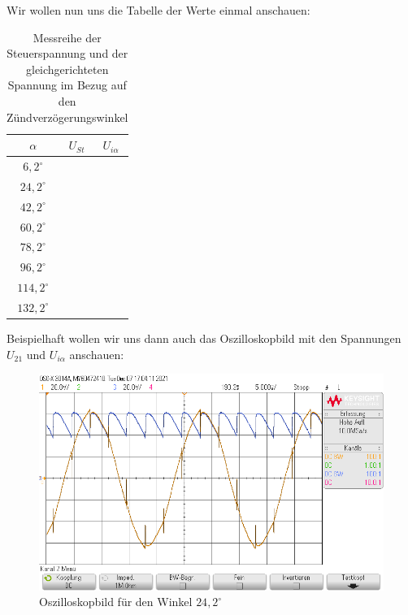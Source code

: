 \documentclass{article}
\begin{document}
\newpage

Wir wollen nun uns die Tabelle der Werte einmal anschauen:

\begin{table}[h]
  \centering
  \begin{tabular}{|c|c|c|}
    \hline
    $\alpha$ & $U_{St}$ & $U_{i\alpha}$ \\
    \hline
    $6,2^{\circ}$ & & \\
    \hline
    $24,2^{\circ}$ & & \\
    \hline
    $42,2^{\circ}$ & & \\
    \hline
    $60,2^{\circ}$ & & \\
    \hline
    $78,2^{\circ}$ & & \\
    \hline
    $96,2^{\circ}$ & & \\
    \hline
    $114,2^{\circ}$ & & \\
    \hline
    $132,2^{\circ}$ & & \\
    \hline
  \end{tabular}
  \caption{Messreihe der Steuerspannung und der gleichgerichteten Spannung im Bezug auf den Zündverzögerungswinkel}
  \label{tab:mess1}
\end{table}

Beispielhaft wollen wir uns dann auch das Oszilloskopbild mit den Spannungen $U_{21}$ und $U_{i\alpha}$ anschauen:

\begin{figure}[h]
  \centering
  \includegraphics[width=\textwidth]{../assets/images/GEP2/31_Winkel242.png}
  \caption{Oszilloskopbild für den Winkel $24,2^{\circ}$}
  \label{fig:31_242}
\end{figure}
\end{document}
